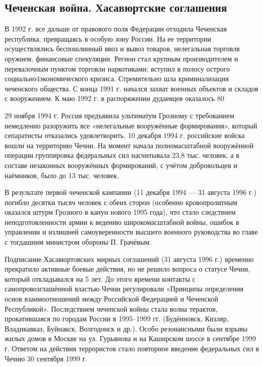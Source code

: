 \subsection{Чеченская война. Хасавюртские соглашения}
В 1992 г. все дальше от правового поля Федерации отходила Чеченская республика, превращаясь в особую зону России. На ее территории осуществлялись беспошлинный ввоз и вывоз товаров, нелегальная торговля оружием, финансовые спекуляции. Регион стал крупным производителем и перевалочным пунктом торговли наркотиками; вступил в полосу острого социально4экономического кризиса. Стремительно шла криминализация чеченского общества. С конца 1991 г. начался захват военных объектов и складов с вооружением. К маю 1992 г. в распоряжении дудаевцев оказалось 80%

29 ноября 1994 г. Россия предъявила ультиматум Грозному с требованием немедленно разоружить все «нелегальные вооружённые формирования», который сепаратисты отказались удовлетворить. 10 декабря 1994 г. российские войска вошли на территорию Чечни. На момент начала полномасштабной вооружённой операции группировка федеральных сил насчитывала 23,8 тыс. человек, а в составе незаконных вооружённых формирований, с учётом добровольцев и наёмников, было до 13 тыс. человек.

В результате первой чеченской кампании (11 декабря 1994 — 31 августа 1996 г.) погибло десятки тысяч человек с обеих сторон (особенно кровопролитным оказался штурм Грозного в канун нового 1995 года), что стало следствием неподготовленности армии к ведению широкомасштабной войны, ошибок в управлении и излишней самоуверенности высшего военного руководства во главе с тогдашним министром обороны П. Грачёвым. 

Подписание Хасавюртовских мирных соглашений (31 августа 1996 г.) временно прекратило активные боевые действия, но не решило вопроса о статусе Чечни, который откладывался на 5 лет. До этого времени контакты с самопровозглашённой властью Чечни регулировали «Принципы определения основ взаимоотношений между Российской Федерацией и Чеченской Республикой». Последствием чеченской войны стала волна терактов, прокатившаяся по городам России в 1995–1999 гг. (Будённовск, Кизляр, Владикавказ, Буйнакск, Волгодонск и др.). Особо резонансными были взрывы жилых домов в Москве на ул. Гурьянова и на Каширском шоссе в сентябре 1999 г. Ответом на действия террористов стало повторное введение федеральных сил в Чечню 30 сентября 1999 г.

